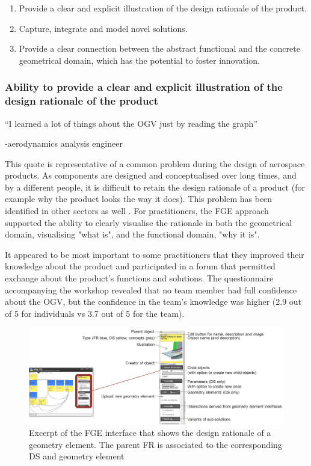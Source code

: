 \documentclass[preprints,article,accept,moreauthors,pdftex]{Definitions/mdpi}
\begin{document}
\begin{enumerate}
	\item Provide a clear and explicit illustration of the design rationale of the product. 
	\item Capture, integrate and model novel solutions.
	\item Provide a clear connection between the abstract functional and the concrete geometrical domain, which has the potential to foster innovation.
\end{enumerate}

\subsubsection{Ability to provide a clear and explicit illustration of the design rationale of the product }

\begin{center}
    “I learned a lot of things about the OGV just by reading the graph” 
\end{center}
\begin{flushright}
    -aerodynamics analysis engineer
\end{flushright}


This quote is representative of a common problem during the design of aerospace products. As components are designed and conceptualised over long times, and by a different people, it is difficult to retain the design rationale of a product (for example why the product looks the way it does). This problem has been identified in other sectors as well \citep{Bracewell2009}. 
For practitioners, the FGE approach supported the ability to clearly visualise the rationale in both the geometrical domain, visualising "what is", and the functional domain, "why it is".

It appeared to be most important to some practitioners that they improved their knowledge about the product and participated in a forum that permitted exchange about the product's functions and solutions.
The questionnaire accompanying the workshop revealed that no team member had full confidence about the \ac{OGV}, but the confidence in the team's knowledge was higher (2.9 out of 5 for individuals vs 3.7 out of 5 for the team).

\begin{figure}[ht]
    \centering
    \includegraphics[width=\textwidth]{figures/validationDetails.png}
    \caption{Excerpt of the FGE interface that shows the design rationale of a geometry element. The parent FR is associated to the corresponding DS and geometry element}
    \label{fig:interface}
\end{figure}
\end{document}
